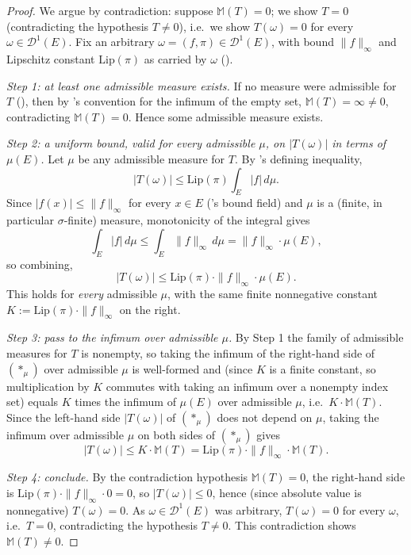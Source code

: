 \begin{proof}
  We argue by contradiction: suppose $\mathbb{M}(T) = 0$; we show $T = 0$ (contradicting the
  hypothesis $T \ne 0$), i.e.\ we show $T(\omega) = 0$ for every $\omega \in \mathcal{D}^1(E)$. Fix
  an arbitrary $\omega = (f,\pi) \in \mathcal{D}^1(E)$, with bound $\|f\|_\infty$ and Lipschitz
  constant $\mathrm{Lip}(\pi)$ as carried by $\omega$ ().

  \emph{Step 1: at least one admissible measure exists.} If no measure were admissible for $T$
  (), then by 's convention for the infimum of the
  empty set, $\mathbb{M}(T) = \infty \ne 0$, contradicting $\mathbb{M}(T)=0$. Hence some admissible
  measure exists.

  \emph{Step 2: a uniform bound, valid for every admissible $\mu$, on $|T(\omega)|$ in terms of
  $\mu(E)$.} Let $\mu$ be any admissible measure for $T$. By 's defining
  inequality,
  \[
    |T(\omega)| \le \mathrm{Lip}(\pi) \int_E |f| \, d\mu
    .
  \]
  Since $|f(x)| \le \|f\|_\infty$ for every $x\in E$ ('s bound field) and $\mu$ is a
  (finite, in particular $\sigma$-finite) measure, monotonicity of the integral gives
  \[
    \int_E |f| \, d\mu \le \int_E \|f\|_\infty \, d\mu = \|f\|_\infty \cdot \mu(E)
    ,
  \]
  so combining,
  \[
    |T(\omega)| \le \mathrm{Lip}(\pi) \cdot \|f\|_\infty \cdot \mu(E)
    . \tag{$\ast_\mu$}
  \]
  This holds for \emph{every} admissible $\mu$, with the same finite nonnegative constant
  $K := \mathrm{Lip}(\pi)\cdot\|f\|_\infty$ on the right.

  \emph{Step 3: pass to the infimum over admissible $\mu$.} By Step 1 the family of admissible
  measures for $T$ is nonempty, so taking the infimum of the right-hand side of $(\ast_\mu)$ over
  admissible $\mu$ is well-formed and (since $K$ is a finite constant, so multiplication by $K$
  commutes with taking an infimum over a nonempty index set) equals $K$ times the infimum of
  $\mu(E)$ over admissible $\mu$, i.e.\ $K \cdot \mathbb{M}(T)$. Since the left-hand side
  $|T(\omega)|$ of $(\ast_\mu)$ does not depend on $\mu$, taking the infimum over admissible $\mu$
  on both sides of $(\ast_\mu)$ gives
  \[
    |T(\omega)| \le K \cdot \mathbb{M}(T) = \mathrm{Lip}(\pi)\cdot\|f\|_\infty \cdot \mathbb{M}(T)
    .
  \]

  \emph{Step 4: conclude.} By the contradiction hypothesis $\mathbb{M}(T)=0$, the right-hand side
  is $\mathrm{Lip}(\pi)\cdot\|f\|_\infty\cdot 0 = 0$, so $|T(\omega)| \le 0$, hence (since absolute
  value is nonnegative) $T(\omega)=0$. As $\omega\in\mathcal{D}^1(E)$ was arbitrary, $T(\omega)=0$
  for every $\omega$, i.e.\ $T=0$, contradicting the hypothesis $T\ne 0$. This contradiction shows
  $\mathbb{M}(T)\ne 0$.
\end{proof}
